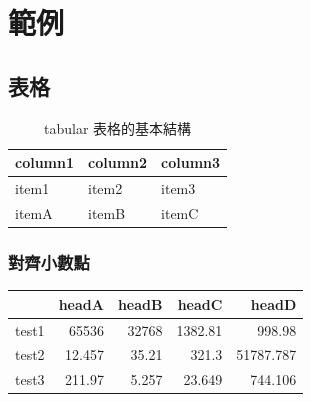 \chapter{範例}\label{example}

\section{表格}
\begin{table}[h]
   \centering
   \caption{tabular 表格的基本結構}\label{booktabs_1}
		\begin{tabular}[t]{lll}
		\hline
		column1 & column2 & column3 \\
		\hline
		item1   & item2   & item3 \\
		itemA   & itemB   & itemC \\
		\hline
		\end{tabular}
\end{table}

\subsection{對齊小數點}
\begin{tabular}{lD{.}{.}{3}D{.}{.}{3}D{.}{.}{3}D{.}{.}{3}}
   \toprule
         & headA & headB & headC & headD \\
   \midrule
   test1 & 65536  & 32768 & 1382.81 & 998.98 \\
   test2 & 12.457 & 35.21 & 321.3   & 51787.787 \\
   test3 & 211.97 & 5.257& 23.649 & 744.106 \\
   \bottomrule
\end{tabular}
\clearpage

